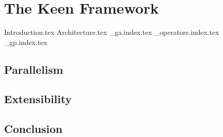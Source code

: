 
\chapter{The Keen Framework}
\label{chap:keen}
  {Introduction.tex}
  {Architecture.tex}
  {_ga.index.tex}
  {_operators.index.tex}
  {_gp.index.tex}
  \section{Parallelism}
  \label{sec:parallelism}
    \Blindtext
  \section{Extensibility}
  \label{sec:extensibility}
    \Blindtext
  \section{Conclusion}
  \label{sec:conclusion}
    \Blindtext
